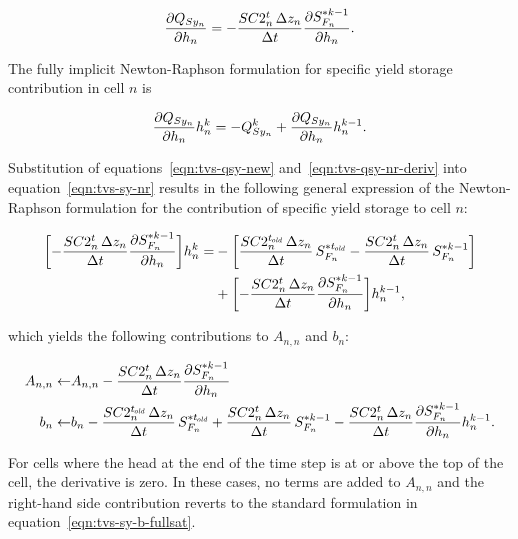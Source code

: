 \begin{equation}
	\label{eqn:tvs-qsy-nr-deriv}
	\frac{\partial Q_{Sy_n}}{\partial h_n} = - \frac{SC2_n^t \, \Delta z_n}{\Delta t} \frac{\partial S_{F_n}^{\ast k-1}}{\partial h_n} .
\end{equation}

\noindent The fully implicit Newton-Raphson formulation for specific yield storage contribution in cell $n$ is

\begin{equation}
	\label{eqn:tvs-sy-nr}
	\frac{\partial Q_{Sy_n}}{\partial h_n} h_n^k = -Q_{Sy_n}^k + \frac{\partial Q_{Sy_n}}{\partial h_n} h_n^{k-1} .
\end{equation}

\noindent Substitution of equations~\ref{eqn:tvs-qsy-new} and~\ref{eqn:tvs-qsy-nr-deriv} into equation~\ref{eqn:tvs-sy-nr} results in the following general expression of the Newton-Raphson formulation for the contribution of specific yield storage to cell $n$:

\begin{equation}
	\label{eqn:tvs-sy-nr-expanded}
	\begin{aligned}
		\biggl[ - \frac{SC2_n^t \, \Delta z_n}{\Delta t} \frac{\partial S_{F_n}^{\ast k-1}}{\partial h_n} \biggr] h_n^k =
		& - \biggl[ \frac{SC2_n^{t_\mathit{\kern -0.07em old}} \, \Delta z_n}{\Delta t} \, S_{F_n}^{\ast t_\mathit{\kern -0.07em old}} - \frac{SC2_n^t \, \Delta z_n}{\Delta t} \, S_{F_n}^{\ast k-1} \biggr] \\
		& + \biggl[ - \frac{SC2_n^t \, \Delta z_n}{\Delta t} \frac{\partial S_{F_n}^{\ast k-1}}{\partial h_n} \biggr] h_n^{k-1} ,
	\end{aligned}
\end{equation}

\noindent which yields the following contributions to $A_{n,n}$ and $b_n$:

\begin{equation}
	\label{eqn:tvs-sy-Ab-std}
	\begin{aligned}
		A_{n,n} \leftarrow & A_{n,n} - \frac{SC2_n^t \, \Delta z_n}{\Delta t} \frac{\partial S_{F_n}^{\ast k-1}}{\partial h_n} \\
		b_n \leftarrow & b_n - \frac{SC2_n^{t_\mathit{\kern -0.07em old}} \, \Delta z_n}{\Delta t} \, S_{F_n}^{\ast t_\mathit{\kern -0.07em old}} + \frac{SC2_n^t \, \Delta z_n}{\Delta t} \, S_{F_n}^{\ast k-1} - \frac{SC2_n^t \, \Delta z_n}{\Delta t} \frac{\partial S_{F_n}^{\ast k-1}}{\partial h_n} h_n^{k-1} .
	\end{aligned}
\end{equation}

\noindent For cells where the head at the end of the time step is at or above the top of the cell, the derivative is zero. In these cases, no terms are added to $A_{n,n}$ and the right-hand side contribution reverts to the standard formulation in equation~\ref{eqn:tvs-sy-b-fullsat}.
